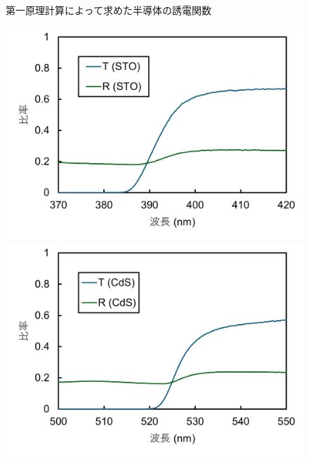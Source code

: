 \documentclass[11pt,dvipdfmx,a4paper]{jsarticle}
\begin{document}
\begin{figure}[H]
\begin{minipage}[t]{0.48\columnwidth}
    \end{minipage}
    \caption{第一原理計算によって求めた半導体の誘電関数}

    \begin{minipage}[t]{0.48\columnwidth}
        \centering
        \includegraphics[width = \columnwidth]{graph/graphA.png}
        \caption{}
    \end{minipage}
    \hfil
    \begin{minipage}[t]{0.48\columnwidth}
        \centering
        \includegraphics[width = \columnwidth]{graph/graphB.png}
        \caption{}
    \end{minipage}\\
    \begin{minipage}[t]{0.48\columnwidth}

\end{minipage}
\end{figure}
\end{document}
